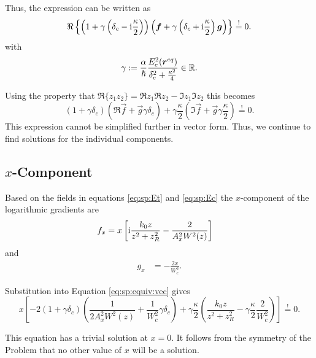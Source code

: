 Thus, the expression can be written as
\begin{equation}
        \Re\left\{ \left(1 + 
            \gamma \left(\delta_c - \mathrm{i} \frac{\kappa}{2} \right) \right)
        \left(\bm{f} +  
            \gamma \left( \delta_c + \mathrm{i}\frac{\kappa}{2} \right)
            \bm{g} \right)  \right\} 
    \overset{!}{=}0.
\end{equation}
with 
\begin{equation}
    \gamma := \frac{\alpha}{\hbar} \frac{ E_c^2(\bm{r}^{eq})}{\delta_c^2 +\frac{\kappa^2}{4}} \in \mathbb{R}.
\end{equation}

Using the property that $\Re \{z_1z_2\} = \Re z_1 \Re z_2 - \Im z_1\Im z_2$ this becomes
\begin{equation}
    \left( 1+\gamma \delta_c\right)
        \left( \Re \vec f + \vec g \gamma \delta_c \right) 
    + \gamma \frac{\kappa}{2} 
        \left( \Im \vec f + \vec g \gamma \frac{\kappa}{2}\right) \overset{!}{=}0.
        \label{eq:sp:equiv:vec}
\end{equation}
This expression cannot be simplified further in vector form.
Thus, we continue to find solutions for the individual components.

\subsection{\texorpdfstring{$x$}{x}-Component}
\label{ssec:sp:extrem:x}

Based on the fields in equations \eqref{eq:sp:Et} and \eqref{eq:sp:Ec}
    the $x$-component of the logarithmic gradients are
\begin{align}
    f_x &= x \left[ \mathrm{i}\frac{k_0z}{z^2+z_R^2} - \frac{2}{A_x^2 W^2(z)}\right] 
\end{align}
and 
\begin{align}
    g_x &= -\frac{2x}{W_c^2}.
\end{align}

Substitution into Equation \eqref{eq:sp:equiv:vec} gives
\begin{equation}
    x \left[ 
        -2(1+\gamma \delta_c)\left( \frac{1}{2A_x^2W^2(z)} + \frac{1}{W_c^2}\gamma\delta_c \right)
        +\gamma\frac{\kappa}{2}\left( \frac{k_0z}{z^2+z_R^2}-\gamma\frac{\kappa}2 \frac{2}{W_c^2} \right)
    \right] \overset{!}{=} 0.
\end{equation}

This equation has a trivial solution at $x=0$.
It follows from the symmetry of the Problem that no other value of $x$ will be a solution.

